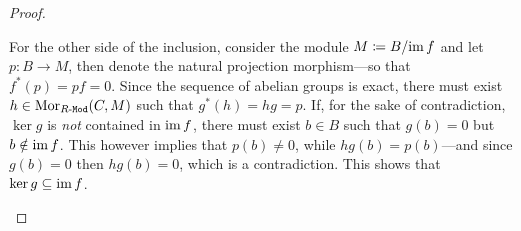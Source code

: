 \begin{proof}
\begin{enumerate}[(a)]
              For the other side of the inclusion, consider the module
              \(M \coloneq B/{\operatorname{im} f}\) and let \(p: B \to M\), then  denote the natural
              projection morphism---so that \(f^{*}(p) = p f = 0\). Since the sequence of
              abelian groups is exact, there must exist \(h \in \operatorname{Mor}_{{R\text{-}\texttt{Mod}}}(C, M)\) such
              that \(g^{*}(h) = h g = p\). If, for the sake of contradiction, \(\ker g\) is
              \emph{not} contained in \(\operatorname{im} f\), there must exist \(b \in B\) such that
              \(g(b) = 0\) but \(b \notin \operatorname{im} f\). This however implies that \(p(b) \neq
              0\), while \(h g(b) = p(b)\)---and since \(g(b) = 0\) then \(h g (b) = 0\),
              which is a contradiction. This shows that \(\ker g \subseteq \operatorname{im} f\).
    \end{enumerate}
\end{proof}

